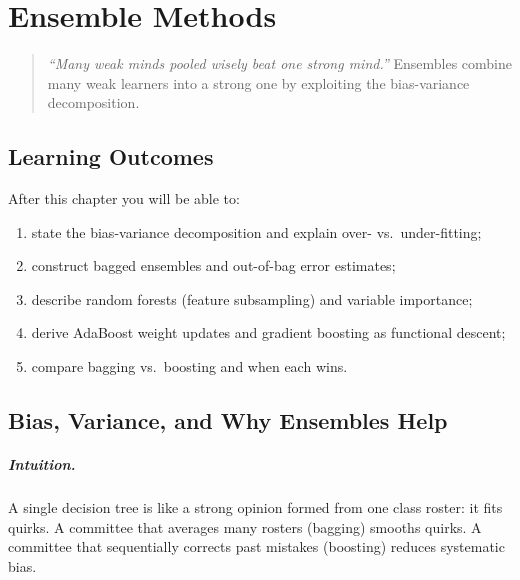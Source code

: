 \chapter{Ensemble Methods}
\label{ch:ensemble}

\begin{quote}
\emph{``Many weak minds pooled wisely beat one strong mind.''} Ensembles combine many weak learners into a strong one by exploiting the bias-variance decomposition.
\end{quote}

\noindent{}
\vspace{0.4em}

\section*{Learning Outcomes}
After this chapter you will be able to:
\begin{enumerate}[label=(L\arabic*)]
    \item state the bias-variance decomposition and explain over- vs.\ under-fitting;
    \item construct bagged ensembles and out-of-bag error estimates;
    \item describe random forests (feature subsampling) and variable importance;
    \item derive AdaBoost weight updates and gradient boosting as functional descent;
    \item compare bagging vs.\ boosting and when each wins.
\end{enumerate}

\section{Bias, Variance, and Why Ensembles Help}
\label{sec:bias-variance}
\paragraph{Intuition.} A single decision tree is like a strong opinion formed from one class roster: it fits quirks. A committee that averages many rosters (bagging) smooths quirks. A committee that sequentially corrects past mistakes (boosting) reduces systematic bias.

